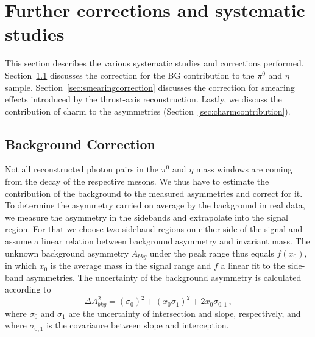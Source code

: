 \section{Further corrections and systematic studies}
\label{sec:sysStudies}

This section describes the various systematic studies and corrections performed. 
Section~\ref{sec:backgroundcorrection} discusses the correction for the BG contribution to the $\pi^0$ and $\eta$ sample. 
Section~\ref{sec:smearingcorrection} discusses the correction for smearing effects introduced by the thrust-axis reconstruction. 
Lastly, we discuss the contribution of charm to the asymmetries (Section~\ref{sec:charmcontribution}).

\subsection{Background Correction}
\label{sec:backgroundcorrection}

Not all reconstructed photon pairs in the $\pi^0$ and $\eta$ mass windows are coming from the decay of the respective mesons. We thus have to estimate the contribution of the background to the measured asymmetries and correct for it.
To determine the asymmetry carried on average by the background in real data, we measure the asymmetry in the sidebands and extrapolate into the signal region.
For that we choose two sideband regions on either side of the signal and assume a linear relation between background asymmetry and invariant mass. 
The unknown background asymmetry $A_{bkg}$ under the peak range thus equals $f(x_0)$, in which $x_0$ is the average mass in the signal range and \(f\) a linear fit to the side-band asymmetries.
The uncertainty of the background asymmetry is calculated according to 
\begin{equation}
\Delta A^2_{bkg}= (\sigma_0)^2 + (x_0\sigma_1)^2 + 2x_0\sigma_{0,1} \, , 
\label{eqn:asybkgerr}
\end{equation}
where $\sigma_0$ and $\sigma_1$ are the uncertainty of intersection and slope, respectively, and where $\sigma_{0,1}$ is the covariance between slope and interception.

